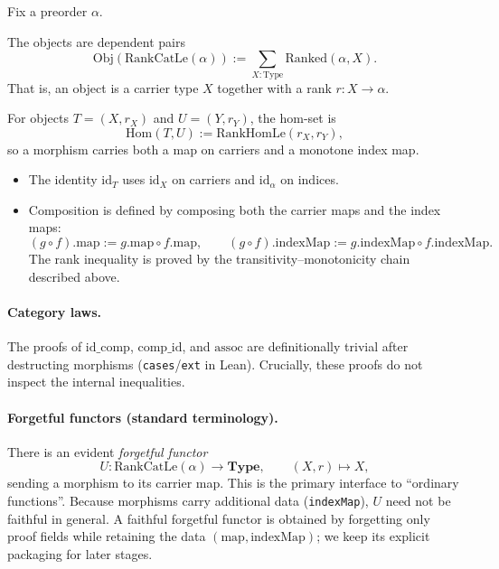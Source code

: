 Fix a preorder $\alpha$.

\begin{definition}
The objects are dependent pairs
\[
  \mathrm{Obj}(\mathrm{RankCatLe}(\alpha)) := \sum_{X:\mathrm{Type}} \mathrm{Ranked}(\alpha,X).
\]
That is, an object is a carrier type $X$ together with a rank $r : X\to\alpha$.
\end{definition}

\begin{definition}
For objects $T=(X,r_X)$ and $U=(Y,r_Y)$, the hom-set is
\[
  \mathrm{Hom}(T,U) := \mathrm{RankHomLe}(r_X,r_Y),
\]
so a morphism carries both a map on carriers and a monotone index map.
\end{definition}

\begin{definition}
\begin{itemize}
\item The identity $\mathrm{id}_T$ uses $\mathrm{id}_X$ on carriers and $\mathrm{id}_\alpha$ on indices.
\item Composition is defined by composing both the carrier maps and the index maps:
\[
  (g\circ f).\mathrm{map} := g.\mathrm{map}\circ f.\mathrm{map},\qquad
  (g\circ f).\mathrm{indexMap} := g.\mathrm{indexMap}\circ f.\mathrm{indexMap}.
\]
The rank inequality is proved by the transitivity--monotonicity chain described above.
\end{itemize}
\end{definition}

\paragraph{Category laws.}
The proofs of $\mathrm{id}\_\mathrm{comp}$, $\mathrm{comp}\_\mathrm{id}$, and $\mathrm{assoc}$ are
definitionally trivial after destructing morphisms (\texttt{cases}/\texttt{ext} in Lean).
Crucially, these proofs do not inspect the internal inequalities.

\paragraph{Forgetful functors (standard terminology).}
There is an evident \emph{forgetful functor}
\[
  U : \mathrm{RankCatLe}(\alpha) \longrightarrow \mathbf{Type},\qquad (X,r)\mapsto X,
\]
sending a morphism to its carrier map. This is the primary interface to ``ordinary functions''.
Because morphisms carry additional data (\texttt{indexMap}), $U$ need not be faithful in general.
A faithful forgetful functor is obtained by forgetting only proof fields while retaining the data
$(\mathrm{map},\mathrm{indexMap})$; we keep its explicit packaging for later stages.

